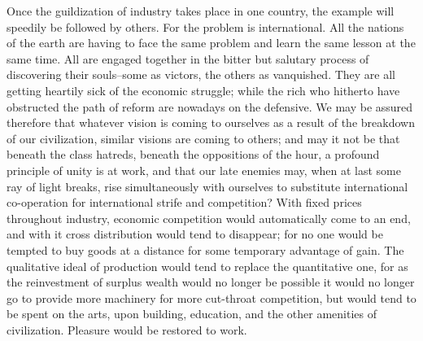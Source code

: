 \documentclass{book}
\begin{document}
Once the guildization of industry takes place in one country, the example will speedily be followed by others. For the problem is international. All the nations of the earth are having to face the same problem and learn the same lesson at the same time. All are engaged together in the bitter but salutary process of discovering their souls–some as victors, the others as vanquished. They are all getting heartily sick of the economic struggle; while the rich who hitherto have obstructed the path of reform are nowadays on the defensive. We may be assured therefore that whatever vision is coming to ourselves as a result of the breakdown of our civilization, similar visions are coming to others; and may it not be that beneath the class hatreds, beneath the oppositions of the hour, a profound principle of unity is at work, and that our late enemies may, when at last some ray of light breaks, rise simultaneously with ourselves to substitute international co-operation for international strife and competition? With fixed prices throughout industry, economic competition would automatically come to an end, and with it cross distribution would tend to disappear; for no one would be tempted to buy goods at a distance for some temporary advantage of gain. The qualitative ideal of production would tend to replace the quantitative one, for as the reinvestment of surplus wealth would no longer be possible it would no longer go to provide more machinery for more cut-throat competition, but would tend to be spent on the arts, upon building, education, and the other amenities of civilization. Pleasure would be restored to work.
\end{document}
